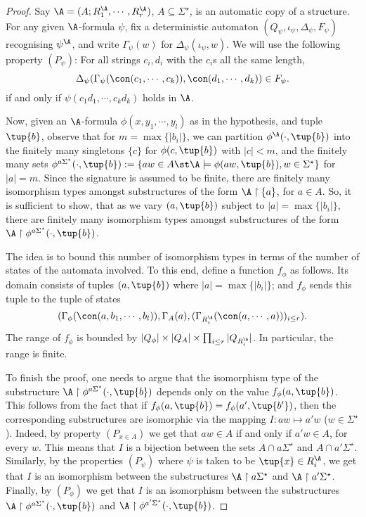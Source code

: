 \begin{proof}
Say $\A = (A;R^{\A}_1, \cdots, R^{\A}_r)$, $A \subseteq \Sigma^{\star}$, is an
automatic copy of a structure.  For any given $\A$-formula $\psi$, fix a
deterministic automaton
$(Q_\psi,\iota_\psi,\Delta_\psi,F_\psi)$ recognising $\psi^{\A}$, and write
$\Gamma_\psi(w)$ for $\Delta_\psi(\iota_\psi,w)$.
We will use the following property $(P_{\psi})$:
For all strings $c_i,d_i$ with the $c_i$s all the same length,
$$
\Delta_\psi(\Gamma_\psi(\con(c_1,\cdots,c_k)),\con(d_1,\cdots,d_k)) \in F_\psi.
$$
if and only if $\psi(c_1d_1,\cdots,c_kd_k)$ holds in $\A$.

Now, given an $\A$-formula $\phi(x,y_1,\cdots,y_l)$ as in the hypothesis,
and tuple $\tup{b}$,
observe that for $m = \max\{|b_i|\}$, we can partition $\phi^{\A}(\cdot,\tup{b})$
into the finitely many singletons $\{c\}$ for $\phi(c,\tup{b})$ with $|c| <
m$, and the finitely many sets $\phi^{a \Sigma^{\star}}(\cdot,\tup{b}) := \{aw \in A \st \A \models \phi(aw,\tup{b}), w \in \Sigma^{\star}\}$ for
$|a| = m$. Since the signature is assumed to be finite, there are finitely
many isomorphism types amongst substructures of the form $\A \restriction
\{a\}$, for $a \in A$. So, it is sufficient to show, that as we vary
$(a,\tup{b})$ subject to $|a| = \max\{|b_i|\}$, there are finitely many isomorphism
types amongst substructures of the form $\A \restriction \phi^{a \Sigma^{\star}}(\cdot,\tup{b})$.

The idea is to bound this number of isomorphism types in terms of the number
of states of the automata involved. To this end, define a function $f_\phi$ as
follows. Its domain consists of tuples $(a,\tup{b})$ where $|a| =
\max\{|b_i|\}$; and $f_\phi$ sends this tuple to the tuple of states
$$
(\Gamma_\phi(\con(a,b_1,\cdots,b_l)),\Gamma_A(a),
(\Gamma_{R^{\A}_i}(\con(a, \cdots, a)))_{i\leq r}).
$$
The range of $f_\phi$ is bounded by $|Q_\phi| \times |Q_A| \times \prod_{i
\leq r} |Q_{R^{\A}_i}|$. In particular, the range is finite.

To finish the proof, one needs to argue that the isomorphism type of the
substructure $\A \restriction \phi^{a \Sigma^{\star}}(\cdot,\tup{b})$ depends
only on the value $f_\phi(a,\tup{b})$. This follows from the fact that if
$f_\phi(a,\tup{b}) = f_\phi(a',\tup{b'})$, then the corresponding substructures
are isomorphic via the mapping $I:aw \mapsto a'w$ ($w \in \Sigma^{\star}$).
Indeed, by property $(P_{x \in A})$ we get that $aw \in A$ if and only if $a'w
\in A$, for every $w$.  This means that $I$ is a bijection between the sets
$A \cap a\Sigma^{\star}$ and $A \cap a'\Sigma^{\star}$.
Similarly, by the properties $(P_\psi)$ where $\psi$ is taken to be
$\tup{x} \in R_i^{\A}$,
we get that $I$ is an isomorphism between the substructures $\A \restriction
a\Sigma^{\star}$ and $\A \restriction a'\Sigma^{\star}$.
Finally, by $(P_\phi)$ we get that $I$ is an isomorphism between the
substructures $\A \restriction \phi^{a \Sigma^{\star}}(\cdot,\tup{b})$ and $\A
\restriction \phi^{a' \Sigma^{\star}}(\cdot,\tup{b})$.
\end{proof}

